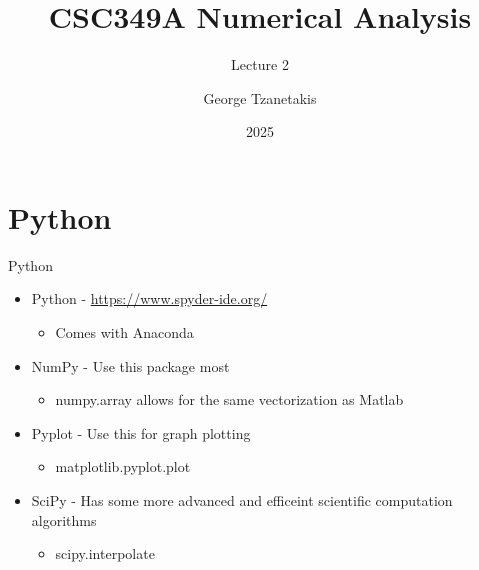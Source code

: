 \documentclass[12pt]{beamer}
\title[CSC349A Numerical Analysis]{CSC349A Numerical Analysis}
\subtitle[Leture 2]{Lecture 2}
\date[2025]{2025}
\author[George Tzanetakis]{George Tzanetakis}
\institute[University of Victoria]{University of Victoria}
\begin{document}
\frame{\maketitle} %








\section{Python} 

\begin{frame}{Python}
\begin{itemize} 
\item{ Python - \url{https://www.spyder-ide.org/}}

\begin{itemize}
\item{Comes with Anaconda}
\end{itemize}

\item{NumPy - Use this package most}

\begin{itemize}
\item{numpy.array allows for the same vectorization as Matlab}
\end{itemize}

\item{Pyplot - Use this for graph plotting}

\begin{itemize}
\item{matplotlib.pyplot.plot}
\end{itemize}

\item{SciPy - Has some more advanced and efficeint scientific computation algorithms}

\begin{itemize}
\item{scipy.interpolate}
\end{itemize} 
\end{itemize} 
\end{frame}
\end{document}
